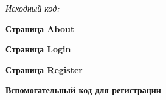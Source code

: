 \documentclass[pscyr, nonums]{hedlab}
\begin{document}
    \pagebreak

    \emph{Исходный код:}
    \begin{center}
        \textbf{Страница About}
    \end{center}
    

    \begin{center}
        \textbf{Страница Login}
    \end{center}
    

    \begin{center}
        \textbf{Страница Register}
    \end{center}
    

    \begin{center}
        \textbf{Вспомогательный код для регистрации}
    \end{center}
    
    
    
\end{document}
